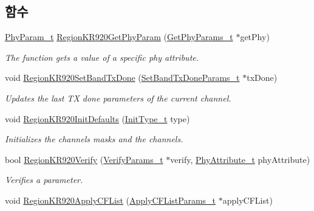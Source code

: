 \subsection*{함수}
\begin{DoxyCompactItemize}
\item 
\mbox{\hyperlink{group___r_e_g_i_o_n_gaed159b26e5c4677236b6e8677019db30}{Phy\+Param\+\_\+t}} \mbox{\hyperlink{group___r_e_g_i_o_n_k_r920_ga108b8547f585d92dd1198c18fc262fa2}{Region\+K\+R920\+Get\+Phy\+Param}} (\mbox{\hyperlink{group___r_e_g_i_o_n_gab471483fff904f4f89bbc03f7fc380ab}{Get\+Phy\+Params\+\_\+t}} $\ast$get\+Phy)
\begin{DoxyCompactList}\small\item\em The function gets a value of a specific phy attribute. \end{DoxyCompactList}\item 
void \mbox{\hyperlink{group___r_e_g_i_o_n_k_r920_ga93e0503b380c2029572737e3fbbcb104}{Region\+K\+R920\+Set\+Band\+Tx\+Done}} (\mbox{\hyperlink{group___r_e_g_i_o_n_gad0524aa0673c0814a71e7a4f9cade3fc}{Set\+Band\+Tx\+Done\+Params\+\_\+t}} $\ast$tx\+Done)
\begin{DoxyCompactList}\small\item\em Updates the last TX done parameters of the current channel. \end{DoxyCompactList}\item 
void \mbox{\hyperlink{group___r_e_g_i_o_n_k_r920_gad6e5f4b30063e9fbd8f6e1b6dea1444d}{Region\+K\+R920\+Init\+Defaults}} (\mbox{\hyperlink{group___r_e_g_i_o_n_gaddc73ae10673ec925724e7870363bda9}{Init\+Type\+\_\+t}} type)
\begin{DoxyCompactList}\small\item\em Initializes the channels masks and the channels. \end{DoxyCompactList}\item 
bool \mbox{\hyperlink{group___r_e_g_i_o_n_k_r920_ga8d91d301043467b48a4ae7f86800a48d}{Region\+K\+R920\+Verify}} (\mbox{\hyperlink{group___r_e_g_i_o_n_ga966d97bc2f25df1c09e92e60ef652276}{Verify\+Params\+\_\+t}} $\ast$verify, \mbox{\hyperlink{group___r_e_g_i_o_n_ga9445b07fdf77581ecfaf389970e635f8}{Phy\+Attribute\+\_\+t}} phy\+Attribute)
\begin{DoxyCompactList}\small\item\em Verifies a parameter. \end{DoxyCompactList}\item 
void \mbox{\hyperlink{group___r_e_g_i_o_n_k_r920_ga7b758b39bc0f003f90deaa751a596b02}{Region\+K\+R920\+Apply\+C\+F\+List}} (\mbox{\hyperlink{group___r_e_g_i_o_n_ga71588e9ad07e34b78fa91d51881fd3c6}{Apply\+C\+F\+List\+Params\+\_\+t}} $\ast$apply\+C\+F\+List)

\end{DoxyCompactItemize}
